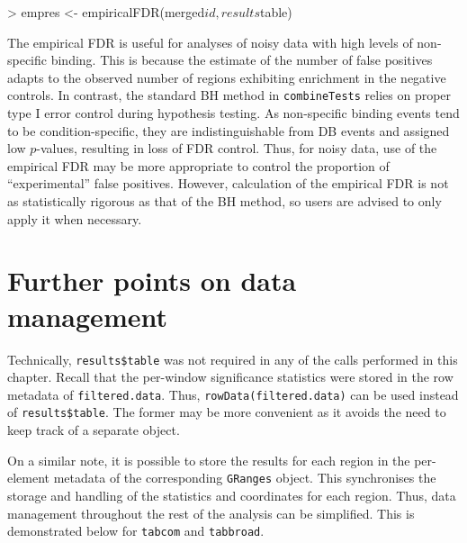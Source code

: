 \documentclass[12pt]{report}
\renewenvironment{Schunk}{\vspace{0pt}}{\vspace{0pt}}
\newcommand{\code}[1]{{\small\texttt{#1}}}
\begin{document}
\begin{Schunk}
\begin{Sinput}
> empres <- empiricalFDR(merged$id, results$table)
\end{Sinput}
\end{Schunk}

The empirical FDR is useful for analyses of noisy data with high levels of non-specific binding.
This is because the estimate of the number of false positives adapts to the observed number of regions exhibiting enrichment in the negative controls.
In contrast, the standard BH method in \code{combineTests} relies on proper type I error control during hypothesis testing.
As non-specific binding events tend to be condition-specific, they are indistinguishable from DB events and assigned low $p$-values, resulting in loss of FDR control.
Thus, for noisy data, use of the empirical FDR may be more appropriate to control the proportion of ``experimental'' false positives.
However, calculation of the empirical FDR is not as statistically rigorous as that of the BH method, so users are advised to only apply it when necessary.

\section{Further points on data management}
Technically, \code{results\$table} was not required in any of the calls performed in this chapter.
Recall that the per-window significance statistics were stored in the row metadata of \code{filtered.data}.
Thus, \code{rowData(filtered.data)} can be used instead of \code{results\$table}.
The former may be more convenient as it avoids the need to keep track of a separate object.

On a similar note, it is possible to store the results for each region in the per-element metadata of the corresponding \code{GRanges} object.
This synchronises the storage and handling of the statistics and coordinates for each region.
Thus, data management throughout the rest of the analysis can be simplified.
This is demonstrated below for \code{tabcom} and \code{tabbroad}.

\begin{Schunk}
\end{Schunk}


\end{document}
